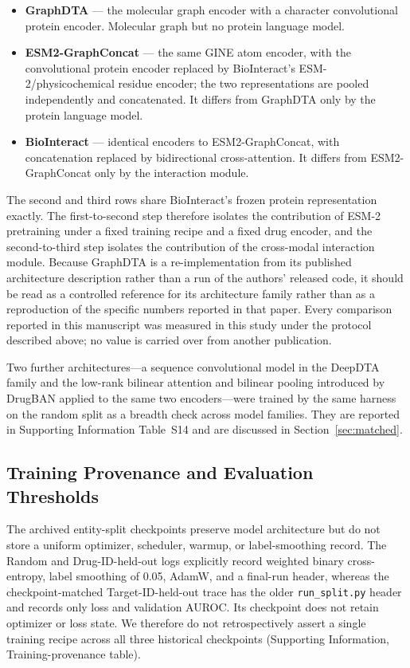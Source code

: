\documentclass[fleqn,10pt]{wlscirep}
\begin{document}
\begin{itemize}[leftmargin=*]
\item \textbf{GraphDTA}\cite{nguyen2021graphdta} --- the molecular graph
  encoder with a character convolutional protein encoder.  Molecular graph but
  no protein language model.
\item \textbf{ESM2-GraphConcat} --- the same GINE atom encoder, with the
  convolutional protein encoder replaced by BioInteract's
  ESM-2/physicochemical residue encoder; the two representations are pooled
  independently and concatenated.  It differs from GraphDTA only by the protein
  language model.
\item \textbf{BioInteract} --- identical encoders to ESM2-GraphConcat, with
  concatenation replaced by bidirectional cross-attention.  It differs from
  ESM2-GraphConcat only by the interaction module.
\end{itemize}

The second and third rows share BioInteract's frozen protein representation
exactly.  The first-to-second step therefore isolates the contribution of ESM-2
pretraining under a fixed training recipe and a fixed drug encoder, and the
second-to-third step isolates the contribution of the cross-modal interaction
module.  Because GraphDTA is a re-implementation from its published
architecture description rather than a run of the authors' released code, it
should be read as a controlled reference for its architecture family rather
than as a reproduction of the specific numbers reported in that paper.  Every
comparison reported in this manuscript was measured in this study under the
protocol described above; no value is carried over from another publication.

Two further architectures---a sequence convolutional model in the DeepDTA
family\cite{ozturk2018deepdta} and the low-rank bilinear attention and bilinear
pooling introduced by DrugBAN\cite{bai2023drugban} applied to the same two
encoders---were trained by the same harness on the random split as a breadth
check across model families.  They are reported in Supporting Information
Table~S14 and are discussed in Section~\ref{sec:matched}.
\endgroup

\subsection{Training Provenance and Evaluation Thresholds}

The archived entity-split checkpoints preserve model architecture but do not
store a uniform optimizer, scheduler, warmup, or label-smoothing record. The
Random and Drug-ID-held-out logs explicitly record weighted binary
cross-entropy, label smoothing of 0.05, AdamW, and a final-run header, whereas
the checkpoint-matched Target-ID-held-out trace has the older
\texttt{run\_split.py} header and records only loss and validation AUROC. Its
checkpoint does not retain optimizer or loss state. We therefore do not
retrospectively assert a single training recipe across all three historical
checkpoints (Supporting Information, Training-provenance table).
\end{document}
